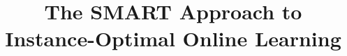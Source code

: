 \documentclass[anon,12pt]{colt2024} %
\title[Instance-Optimal Online Learning]{The SMART Approach to Instance-Optimal Online Learning}
\begin{document}
\maketitle

\begin{abstract}%
 
\end{abstract}


%

% 
% 

%




\newpage


\newpage 
\appendix


\end{document}
